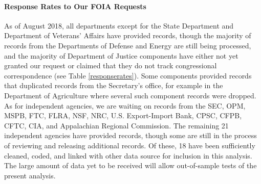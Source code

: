 \documentclass{article}
\begin{document}
\paragraph{Response Rates to Our FOIA Requests} As of August 2018, all departments except for the State Department and Department of Veterans' Affairs have provided records, though the majority of records from the Departments of Defense and Energy are still being processed, and the majority of Department of Justice components have either not yet granted our request or claimed that they do not track congressional correspondence (see Table \ref{responserates}). Some components provided records that duplicated records from the Secretary's office, for example in the Department of Agriculture where several such component records were dropped. As for independent agencies, we are waiting on records from the SEC, OPM, MSPB, FTC, FLRA, NSF, NRC, U.S. Export-Import Bank, CPSC, CFPB, CFTC, CIA, and Appalachian Regional Commission. The remaining 21 independent agencies have provided records, though some are still in the process of reviewing and releasing additional records. Of these, 18 have been sufficiently cleaned, coded, and linked with other data source for inclusion in this analysis. The large amount of data yet to be received will allow out-of-sample tests of the present analysis. 
\end{document}
